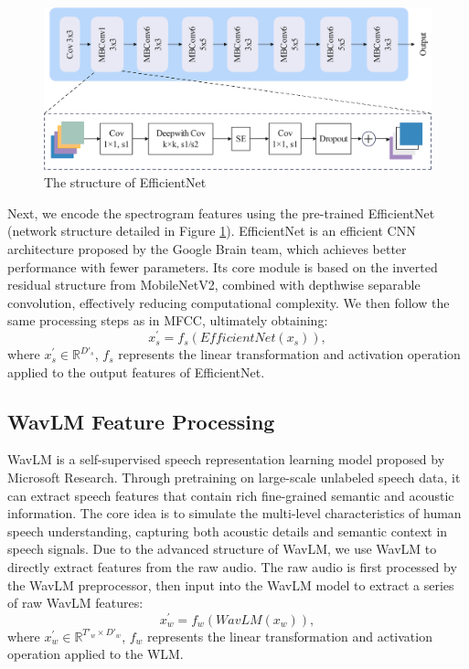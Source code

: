 \documentclass[runningheads]{llncs}
\begin{document}
\begin{figure}[htbp]
\centering
\includegraphics[width=1.0\linewidth]{efficientnet.jpg}
\caption{The structure of EfficientNet}
\label{figure_efficient}
\end{figure}
Next, we encode the spectrogram features using the pre-trained EfficientNet (network structure detailed in Figure \ref{figure_efficient}). EfficientNet is an efficient CNN architecture proposed by the Google Brain team, which achieves better performance with fewer parameters. Its core module is based on the inverted residual structure from MobileNetV2, combined with depthwise separable convolution, effectively reducing computational complexity. We then follow the same processing steps as in MFCC, ultimately obtaining:
\begin{equation}
x^{'}_{s}=f_{s}(EfficientNet(x_s)),
\end{equation}
where \(x^{'}_{s}\in \mathbb{R}^{D'_s}\), \(f_{s}\) represents the linear transformation and activation operation applied to the output features of EfficientNet.

\subsection{WavLM Feature Processing}
WavLM is a self-supervised speech representation learning model proposed by Microsoft Research. Through pretraining on large-scale unlabeled speech data, it can extract speech features that contain rich fine-grained semantic and acoustic information. The core idea is to simulate the multi-level characteristics of human speech understanding, capturing both acoustic details and semantic context in speech signals. Due to the advanced structure of WavLM, we use WavLM to directly extract features from the raw audio. The raw audio is first processed by the WavLM preprocessor, then input into the WavLM model to extract a series of raw WavLM features:
\begin{equation}
x^{'}_{w}=f_{w}(WavLM(x_w)),
\end{equation}
where \(x^{'}_{w}\in \mathbb{R}^{{T'_w}\times {D'_w}}\), \(f_{w}\) represents the linear transformation and activation operation applied to the WLM.
\end{document}

